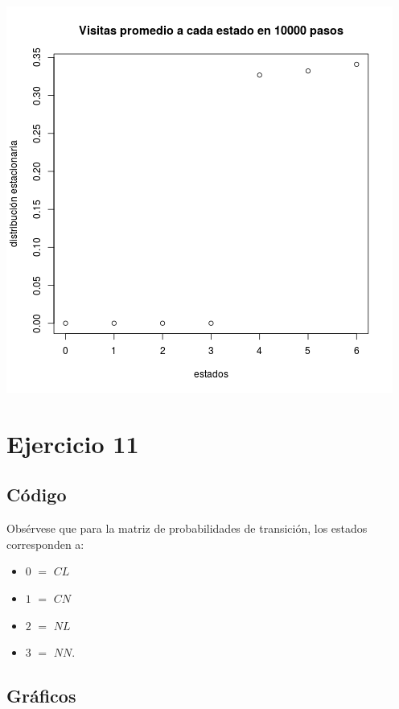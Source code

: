 \documentclass[paper=letter, fontsize=12pt]{scrartcl} %
\numberwithin{equation}{section} %
\numberwithin{figure}{section} %
\numberwithin{table}{section} %
\begin{document}
\includegraphics[scale=0.4]{ej8_3.png}
\newpage

\section{Ejercicio 11}

\subsection{Código}

Obsérvese que para la matriz de probabilidades de transición, los estados corresponden a:
\begin{itemize}
\item $0$ $=$ $CL$
\item $1$ $=$ $CN$
\item $2$ $=$ $NL$
\item $3$ $=$ $NN$.
\end{itemize}



\subsection{Gráficos}
\end{document}
